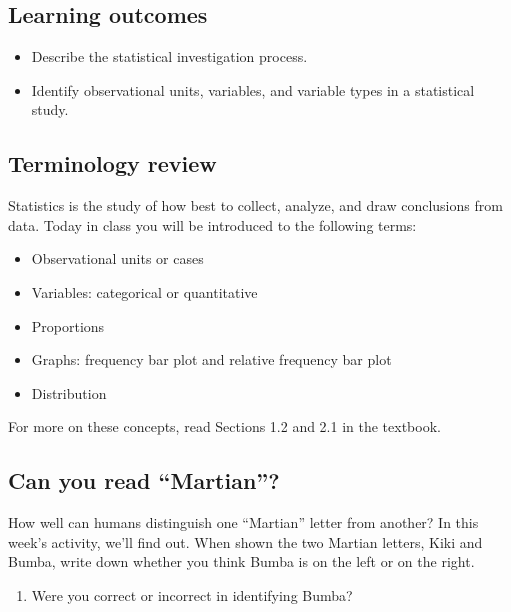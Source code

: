 \documentclass[
]{report}
\providecommand{\tightlist}{%
  \setlength{\itemsep}{0pt}\setlength{\parskip}{0pt}}
\begin{document}

\hypertarget{learning-outcomes}{%
\subsection{Learning outcomes}\label{learning-outcomes}}

\begin{itemize}
\item
  Describe the statistical investigation process.
\item
  Identify observational units, variables, and variable types in a statistical study.
\end{itemize}

\hypertarget{terminology-review}{%
\subsection{Terminology review}\label{terminology-review}}

Statistics is the study of how best to collect, analyze, and draw conclusions from data. Today in class you will be introduced to the following terms:

\begin{itemize}
\item
  Observational units or cases
\item
  Variables: categorical or quantitative
\item
  Proportions
\item
  Graphs: frequency bar plot and relative frequency bar plot
\item
  Distribution
\end{itemize}

For more on these concepts, read Sections 1.2 and 2.1 in the textbook.

\hypertarget{can-you-read-martian}{%
\subsection{Can you read ``Martian''?}\label{can-you-read-martian}}

How well can humans distinguish one ``Martian'' letter from another? In this week's activity, we'll find out. When shown the two Martian letters, Kiki and Bumba, write down whether you think Bumba is on the left or on the right.
\vspace{2mm}

\begin{enumerate}
\def\labelenumi{\arabic{enumi}.}
\tightlist
\item
  Were you correct or incorrect in identifying Bumba?
\end{enumerate}
\end{document}
